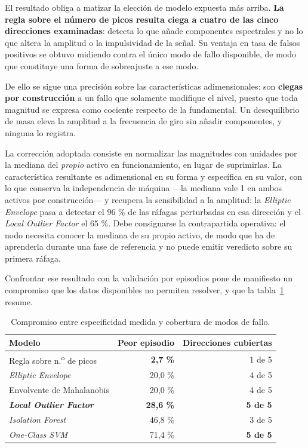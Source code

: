 El resultado obliga a matizar la elección de modelo expuesta más arriba. \textbf{La regla sobre
el número de picos resulta ciega a cuatro de las cinco direcciones examinadas}: detecta lo que
añade componentes espectrales y no lo que altera la amplitud o la impulsividad de la señal. Su
ventaja en tasa de falsos positivos se obtuvo midiendo contra el único modo de fallo disponible,
de modo que constituye una forma de sobreajuste a ese modo.

De ello se sigue una precisión sobre las características adimensionales: son \textbf{ciegas por
construcción} a un fallo que solamente modifique el nivel, puesto que toda magnitud se expresa
como cociente respecto de la fundamental. Un desequilibrio de masa eleva la amplitud a la
frecuencia de giro sin añadir componentes, y ninguna lo registra.

La corrección adoptada consiste en normalizar las magnitudes con unidades por la mediana del
\textit{propio} activo en funcionamiento, en lugar de suprimirlas. La característica resultante
es adimensional en su forma y específica en su valor, con lo que conserva la independencia de
máquina —la mediana vale 1 en ambos activos por construcción— y recupera la sensibilidad a la
amplitud: la \textit{Elliptic Envelope} pasa a detectar el 96 \% de las ráfagas perturbadas en esa
dirección y el \textit{Local Outlier Factor} el 65 \%. Debe consignarse la contrapartida operativa: el nodo necesita conocer la mediana de
su propio activo, de modo que ha de aprenderla durante una fase de referencia y no puede emitir
veredicto sobre su primera ráfaga.

Confrontar ese resultado con la validación por episodios pone de manifiesto un compromiso que
los datos disponibles no permiten resolver, y que la tabla~\ref{table:compromiso} resume.

\begin{table}[ht!]
\caption{Compromiso entre especificidad medida y cobertura de modos de fallo.}
\label{table:compromiso}
\centering
\begin{tabular}{|p{5.0cm}|r|r|}
\hline
\textbf{Modelo} & \textbf{Peor episodio} & \textbf{Direcciones cubiertas} \\
\hline
Regla sobre n.\textsuperscript{o} de picos & \textbf{2,7 \%} & 1 de 5 \\
\hline
\textit{Elliptic Envelope} & 20,0 \% & 4 de 5 \\
\hline
Envolvente de Mahalanobis & 20,0 \% & 4 de 5 \\
\hline
\textbf{\textit{Local Outlier Factor}} & \textbf{28,6 \%} & \textbf{5 de 5} \\
\hline
\textit{Isolation Forest} & 46,8 \% & 3 de 5 \\
\hline
\textit{One-Class SVM} & 71,4 \% & \textbf{5 de 5} \\
\hline
\end{tabular}
\end{table}

